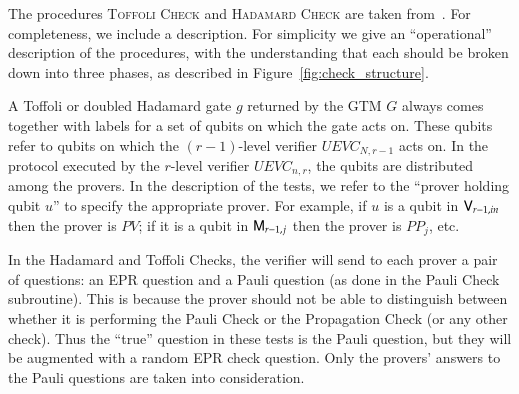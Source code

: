 The procedures  \textsc{Toffoli Check} and \textsc{Hadamard Check} are taken from~\cite{ji2016compression}. For completeness, we include a description. For simplicity we give an ``operational'' description of the procedures, with the understanding that each should be broken down into three phases, as described in Figure~\ref{fig:check_structure}.

A Toffoli or doubled Hadamard gate $g$ returned by the GTM $G$ always comes together with labels for a set of qubits on which the gate acts on. These qubits refer to qubits on which the $(r-1)$-level verifier $UEVC_{N,r-1}$ acts on. In the protocol executed by the $r$-level verifier $UEVC_{n,r}$, the qubits are distributed among the provers. In the description of the tests, we refer to the ``prover holding qubit $u$'' to specify the appropriate prover. For example, if $u$ is a qubit in ${\textsf{V}}_{r-1,in}$ then the prover is $PV$; if it is a qubit in ${\textsf{M}}_{r-1,j}$ then the prover is $PP_j$, etc. 

In the Hadamard and Toffoli Checks, the verifier will send to each prover a pair of questions: an EPR question and a Pauli question (as done in the Pauli Check subroutine). This is because the prover should not be able to distinguish between whether it is performing the Pauli Check or the Propagation Check (or any other check). Thus the ``true'' question in these tests is the Pauli question, but they will be augmented with a random EPR check question. Only the provers' answers to the Pauli questions are taken into consideration.

